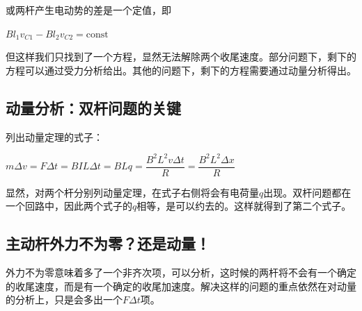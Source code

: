 \documentclass{ctexbook}
\begin{document}
	或两杆产生电动势的差是一个定值，即
	
	\centerline{$B l_1 v_{C1}-B l_2 v_{C2}=\mathrm{const}$}
	
	但这样我们只找到了一个方程，显然无法解除两个收尾速度。部分问题下，剩下的方程可以通过受力分析给出。其他的问题下，剩下的方程需要通过动量分析得出。
	
	\subsection{动量分析：双杆问题的关键}
	列出动量定理的式子：
	
	\centerline{$m \Delta v =F \Delta t=BIL \Delta t=BLq=\dfrac{B^2 L^2 v \Delta t}{R}=\dfrac{B^2 L^2 \Delta x}{R}$}
	
	显然，对两个杆分别列动量定理，在式子右侧将会有电荷量$q$出现。双杆问题都在一个回路中，因此两个式子的$q$相等，是可以约去的。这样就得到了第二个式子。
	
	\subsection{主动杆外力不为零？还是动量！}
	外力不为零意味着多了一个非齐次项，可以分析，这时候的两杆将不会有一个确定的收尾速度，而是有一个确定的收尾加速度。解决这样的问题的重点依然在对动量的分析上，只是会多出一个$F \Delta t$项。
\end{document}
